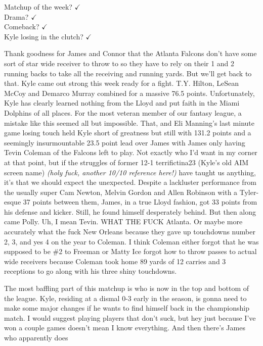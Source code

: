\documentclass[11pt,letterpaper]{article}
\begin{document}
\newpage
{}
\par\noindent Matchup of the week? $\checkmark$
\\ Drama? $\checkmark$
\\ Comeback? $\checkmark$
\\ Kyle losing in the clutch? $\checkmark$
\\\par\noindent Thank goodness for James and Connor that the Atlanta Falcons don't have some sort of star wide receiver to throw to so they have to rely on their 1 and 2 running backs to take all the receiving and running yards. But we'll get back to that. Kyle came out strong this week ready for a fight. T.Y. Hilton, LeSean McCoy and Demarco Murray combined for a massive 76.5 points. Unfortunately, Kyle has clearly learned nothing from the Lloyd and put faith in the Miami Dolphins of all places. For the most veteran member of our fantasy league, a mistake like this seemed all but impossible. That, and Eli Manning's last minute game losing touch held Kyle short of greatness but still with 131.2 points and a seemingly insurmountable 23.5 point lead over James with James only having Tevin Coleman of the Falcons left to play. Not exactly who I'd want in my corner at that point, but if the struggles of former 12-1 terrifictina23 (Kyle’s old AIM screen name) \textit{(holy fuck, another 10/10 reference here!)} have taught us anything, it's that we should expect the unexpected. Despite a lackluster performance from the usually super Cam Newton, Melvin Gordon and Allen Robinson  with a Tyler-esque 37 points between them, James, in a true Lloyd fashion, got 33 points from his defense and kicker. Still, he  found himself desperately behind. But then along came Polly. Uh, I mean Tevin. WHAT THE FUCK Atlanta. Or maybe more accurately what the fuck New Orleans because they gave up touchdowns number 2, 3, and yes 4 on the year to Coleman. I think Coleman either forgot that he was supposed to be \#2 to Freeman or Matty Ice forgot how to throw passes to actual wide receivers because Coleman took home 89 yards of 12 carries and 3 receptions to go along with his three shiny touchdowns. 
\smallskip
\par\noindent The most baffling part of this matchup is who is now in the top and bottom of the league. Kyle, residing at a dismal 0-3 early in the season, is gonna need to make some major changes if he wants to find himself back in the championship match. I would suggest playing players that don't suck, but hey just because I've won a couple games doesn't mean I know everything. And then there's James who apparently does
\end{document}
